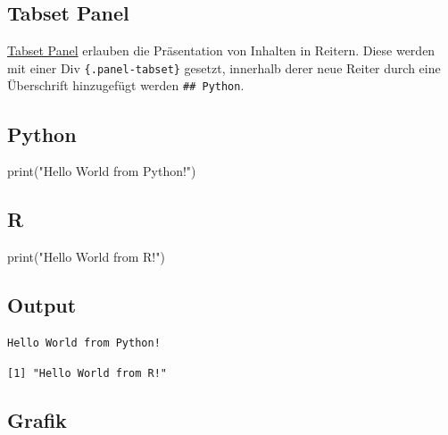 \documentclass[
  letterpaper,
  DIV=11]{scrartcl}
\newenvironment{Shaded}{\begin{snugshade}}{\end{snugshade}}
\newcommand{\BuiltInTok}[1]{\textcolor[rgb]{0.00,0.23,0.31}{#1}}
\newcommand{\FunctionTok}[1]{\textcolor[rgb]{0.28,0.35,0.67}{#1}}
\newcommand{\NormalTok}[1]{\textcolor[rgb]{0.00,0.23,0.31}{#1}}
\newcommand{\StringTok}[1]{\textcolor[rgb]{0.13,0.47,0.30}{#1}}
\begin{document}
\subsection{Tabset Panel}\label{tabset-panel}

\href{https://quarto.org/docs/interactive/layout.html\#tabset-panel}{Tabset
Panel} erlauben die Präsentation von Inhalten in Reitern. Diese werden
mit einer Div \texttt{\{.panel-tabset\}} gesetzt, innerhalb derer neue
Reiter durch eine Überschrift hinzugefügt werden \texttt{\#\#\ Python}.

\subsection{Python}

\begin{Shaded}
\begin{Highlighting}[]
\BuiltInTok{print}\NormalTok{(}\StringTok{"Hello World from Python!"}\NormalTok{)}
\end{Highlighting}
\end{Shaded}

\subsection{R}

\begin{Shaded}
\begin{Highlighting}[]
\FunctionTok{print}\NormalTok{(}\StringTok{"Hello World from R!"}\NormalTok{)}
\end{Highlighting}
\end{Shaded}

\subsection{Output}

\begin{verbatim}
Hello World from Python!
\end{verbatim}

\begin{verbatim}
[1] "Hello World from R!"
\end{verbatim}

\subsection{Grafik}
\end{document}
